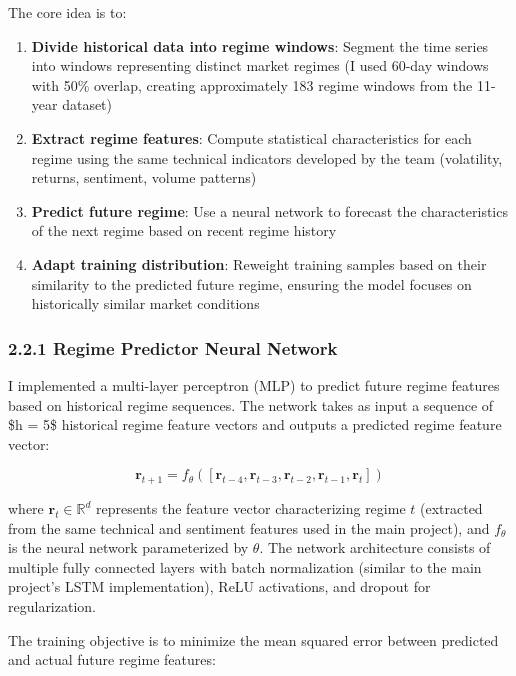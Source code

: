 \documentclass[
]{article}
\begin{document}
The core idea is to:

\begin{enumerate}
\def\labelenumi{\arabic{enumi}.}
\item
  \textbf{Divide historical data into regime windows}: Segment the time
  series into windows representing distinct market regimes (I used
  60-day windows with 50\% overlap, creating approximately 183 regime
  windows from the 11-year dataset)
\item
  \textbf{Extract regime features}: Compute statistical characteristics
  for each regime using the same technical indicators developed by the
  team (volatility, returns, sentiment, volume patterns)
\item
  \textbf{Predict future regime}: Use a neural network to forecast the
  characteristics of the next regime based on recent regime history
\item
  \textbf{Adapt training distribution}: Reweight training samples based
  on their similarity to the predicted future regime, ensuring the model
  focuses on historically similar market conditions
\end{enumerate}

\subsubsection{2.2.1 Regime Predictor Neural
Network}\label{221-regime-predictor-neural-network}

I implemented a multi-layer perceptron (MLP) to predict future regime
features based on historical regime sequences. The network takes as
input a sequence of \$h = 5\$ historical regime feature vectors and
outputs a predicted regime feature vector:

\[\mathbf{r}_{t+1} = f_{\theta}([\mathbf{r}_{t-4}, \mathbf{r}_{t-3}, \mathbf{r}_{t-2}, \mathbf{r}_{t-1}, \mathbf{r}_t])\]

where \(\mathbf{r}_t \in \mathbb{R}^d\) represents the feature vector characterizing regime \(t\) (extracted from the same technical and sentiment features used in the main project), and \(f_{\theta}\) is the neural network parameterized by \(\theta\). The network architecture consists of multiple fully connected layers with batch normalization (similar to the main project's LSTM implementation), ReLU activations, and dropout for regularization.

The training objective is to minimize the mean squared error between
predicted and actual future regime features:
\end{document}
